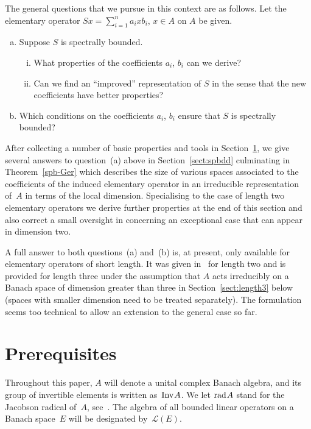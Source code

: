 \documentclass[a4paper,12pt,reqno]{amsart}
\numberwithin{equation}{section}
\theoremstyle{definition}
\begin{document}
The general questions that we pursue in this context are as follows. Let the elementary operator $Sx=\sum_{i=1}^n a_ixb_i$, $x\in A$
on $A$ be given.
\begin{enumerate}[(a)]
\item Suppose $S$ is spectrally bounded.
\begin{enumerate}[(i)]
\item What properties of the coefficients $a_i$, $b_i$ can we derive?
\item Can we find an ``improved'' representation of $S$ in the sense that the new coefficients have better properties?
\end{enumerate}
\item Which conditions on the coefficients $a_i$, $b_i$ ensure that $S$ is spectrally bounded?
\end{enumerate}
After collecting a number of basic properties and tools in Section~\ref{sect:pres}, we give several answers to question~(a) above
in Section~\ref{sect:spbdd} culminating in Theorem~\ref{spb-Ger} which describes the size of various spaces associated
to the coefficients of the induced elementary operator in an irreducible representation of~$A$ in terms of the local dimension.
Specialising to the case of length two elementary operators we derive further properties at the end of this section
and also correct a small oversight in \cite[Theorem 3.5]{NaMa11} concerning an exceptional case that can appear in dimension two.

A full answer to both questions~(a) and~(b) is, at present, only available for elementary operators of short length.
It was given in~\cite{NaMa11} for length two and is provided for length three
under the assumption that $A$ acts irreducibly on a Banach space of dimension greater than three
in Section~\ref{sect:length3} below (spaces with smaller dimension need to be treated separately).
The formulation seems too technical to allow an extension to the general case so far.

\vspace{-.3cm}
\section{Prerequisites}\label{sect:pres}

\noindent
Throughout this paper, $A$ will denote a unital complex Banach algebra, and its group of invertible elements is written
as~${{\textup{Inv}\kern.5pt A}}$. We let ${{\textup{rad}\kern.7pt A}}$ stand for the Jacobson radical of~$A$, see~\cite[p.~34]{Aup}.
The algebra of all bounded linear operators on a Banach space~$E$ will be designated by~${{\mathscr L}(E)}$.
\end{document}
